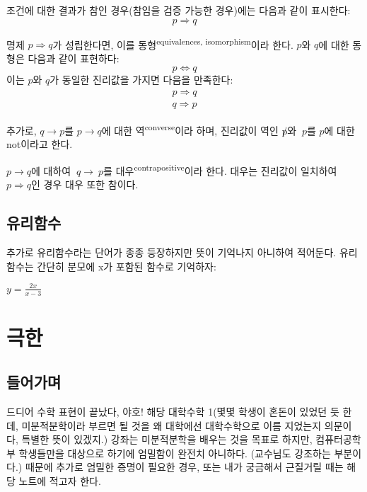 \documentclass[../note.tex]{subfiles}
\begin{document}
조건에 대한 결과가 참인 경우(참임을 검증 가능한 경우)에는 다음과 같이 표시한다:
\begin{equation}
  p \Longrightarrow q
\end{equation}

\begin{definition}[동형]
  명제 $p \Longrightarrow q$가 성립한다면, 이를 동형\textsuperscript{equivalences, isomorphism}이라 한다. $p$와 $q$에 대한 동형은 다음과 같이 표현하다:
  \begin{equation}
    p \Longleftrightarrow q
  \end{equation}
  이는 $p$와 $q$가 동일한 진리값을 가지면 다음을 만족한다:
  \begin{align}
    p \Longrightarrow q \\
    q \Longrightarrow p
  \end{align}
\end{definition}

추가로, $q \longrightarrow p$를 $p \longrightarrow q$에 대한 역\textsuperscript{converse}이라 하며, 진리값이 역인 $\not p$와 $~p$를 $p$에 대한 not이라고 한다.

\begin{definition}
  $p \longrightarrow q$에 대하여 $~q \longrightarrow ~p$를 대우\textsuperscript{contrapositive}이라 한다. 대우는 진리값이 일치하여 $p \Longrightarrow q$인 경우 대우 또한 참이다.
\end{definition}

\section{유리함수}
추가로 유리함수라는 단어가 종종 등장하지만 뜻이 기억나지 아니하여 적어둔다. 유리함수는 간단히 분모에 x가 포함된 함수로 기억하자:
\begin{example}[유리함수 예시]
  \item $y = \frac{2x}{x-3}$
\end{example}

\chapter{극한}
\section{들어가며}
드디어 수학 표현이 끝났다, 야호! 해당 대학수학 1(몇몇 학생이 혼돈이 있었던 듯 한데, 미분적분학이라 부르면 될 것을 왜 대학에선 대학수학으로 이름 지었는지 의문이다, 특별한 뜻이 있겠지.) 강좌는 미분적분학을 배우는 것을 목표로 하지만, 컴퓨터공학부 학생들만을 대상으로 하기에 엄밀함이 완전치 아니하다. (교수님도 강조하는 부분이다.) 때문에 추가로 엄밀한 증명이 필요한 경우, 또는 내가 궁금해서 근질거릴 때는 해당 노트에 적고자 한다.
\end{document}
